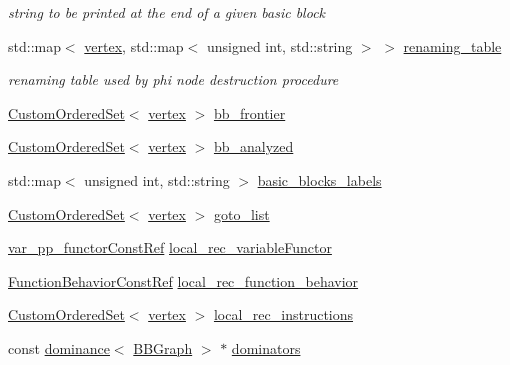 \begin{DoxyCompactItemize}
\begin{DoxyCompactList}\small\item\em string to be printed at the end of a given basic block \end{DoxyCompactList}\item 
std\+::map$<$ \hyperlink{graph_8hpp_abefdcf0544e601805af44eca032cca14}{vertex}, std\+::map$<$ unsigned int, std\+::string $>$ $>$ \hyperlink{classCWriter_a00f3e4355dfcc26f771a853147cf440d}{renaming\+\_\+table}
\begin{DoxyCompactList}\small\item\em renaming table used by phi node destruction procedure \end{DoxyCompactList}\item 
\hyperlink{classCustomOrderedSet}{Custom\+Ordered\+Set}$<$ \hyperlink{graph_8hpp_abefdcf0544e601805af44eca032cca14}{vertex} $>$ \hyperlink{classCWriter_a3c4baa49dedd4b1a28fbd07e4f4964de}{bb\+\_\+frontier}
\item 
\hyperlink{classCustomOrderedSet}{Custom\+Ordered\+Set}$<$ \hyperlink{graph_8hpp_abefdcf0544e601805af44eca032cca14}{vertex} $>$ \hyperlink{classCWriter_abd6b484e10e87323f731f5754d92164a}{bb\+\_\+analyzed}
\item 
std\+::map$<$ unsigned int, std\+::string $>$ \hyperlink{classCWriter_ad7aed67c7d0699eee2a224e68419f0a1}{basic\+\_\+blocks\+\_\+labels}
\item 
\hyperlink{classCustomOrderedSet}{Custom\+Ordered\+Set}$<$ \hyperlink{graph_8hpp_abefdcf0544e601805af44eca032cca14}{vertex} $>$ \hyperlink{classCWriter_a61696d39d3585dafd6a5cc73fa0192b7}{goto\+\_\+list}
\item 
\hyperlink{var__pp__functor_8hpp_a8a6b51b6519401d911398943510557f0}{var\+\_\+pp\+\_\+functor\+Const\+Ref} \hyperlink{classCWriter_af80f335f9f823a734687d9b086f4494d}{local\+\_\+rec\+\_\+variable\+Functor}
\item 
\hyperlink{function__behavior_8hpp_a94872da12ed056b6ecf90456164e0213}{Function\+Behavior\+Const\+Ref} \hyperlink{classCWriter_aa58231b8be5714edffb9aea9107bfe4f}{local\+\_\+rec\+\_\+function\+\_\+behavior}
\item 
\hyperlink{classCustomOrderedSet}{Custom\+Ordered\+Set}$<$ \hyperlink{graph_8hpp_abefdcf0544e601805af44eca032cca14}{vertex} $>$ \hyperlink{classCWriter_a369957abf1562ef733d60ba5795b1aaf}{local\+\_\+rec\+\_\+instructions}
\item 
const \hyperlink{classdominance}{dominance}$<$ \hyperlink{structBBGraph}{B\+B\+Graph} $>$ $\ast$ \hyperlink{classCWriter_a0e081b5f4f221cfda2d094935221cbef}{dominators}

\end{DoxyCompactItemize}
